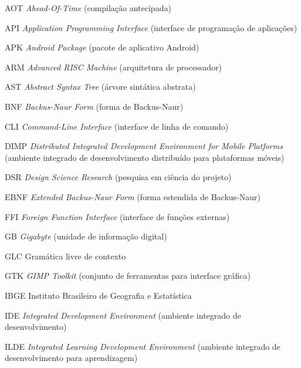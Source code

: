 \documentclass[
    12pt
    ,oneside
    ,a4paper
    ,chapter=TITLE
    ,section=TITLE
    ,sumario=abnt-6027-2012]{abntex2}
\begin{document}
\listadefiguras
\begingroup
\setpnumwidth{2.2em}
\setrmarg{4em}
\listadequadros
\listadetabelas
\endgroup

\begin{siglas}
    \item[AOT] \textit{Ahead-Of-Time} (compilação antecipada)
    \item[API] \textit{Application Programming Interface} (interface de programação de aplicações)
    \item[APK] \textit{Android Package} (pacote de aplicativo Android)
    \item[ARM] \textit{Advanced RISC Machine} (arquitetura de processador)
    \item[AST] \textit{Abstract Syntax Tree} (árvore sintática abstrata)
    \item[BNF] \textit{Backus-Naur Form} (forma de Backus-Naur)
    \item[CLI] \textit{Command-Line Interface} (interface de linha de comando)
    \item[DIMP] \textit{Distributed Integrated Development Environment for Mobile Platforms} (ambiente integrado de desenvolvimento distribuído para plataformas móveis)
    \item[DSR] \textit{Design Science Research} (pesquisa em ciência do projeto)
    \item[EBNF] \textit{Extended Backus-Naur Form} (forma estendida de Backus-Naur)
    \item[FFI] \textit{Foreign Function Interface} (interface de funções externas)
    \item[GB] \textit{Gigabyte} (unidade de informação digital)
    \item[GLC] Gramática livre de contexto
    \item[GTK] \textit{GIMP Toolkit} (conjunto de ferramentas para interface gráfica)
    \item[IBGE] Instituto Brasileiro de Geografia e Estatística
    \item[IDE] \textit{Integrated Development Environment} (ambiente integrado de desenvolvimento)
    \item[ILDE] \textit{Integrated Learning Development Environment} (ambiente integrado de desenvolvimento para aprendizagem)

\end{siglas}
\end{document}
